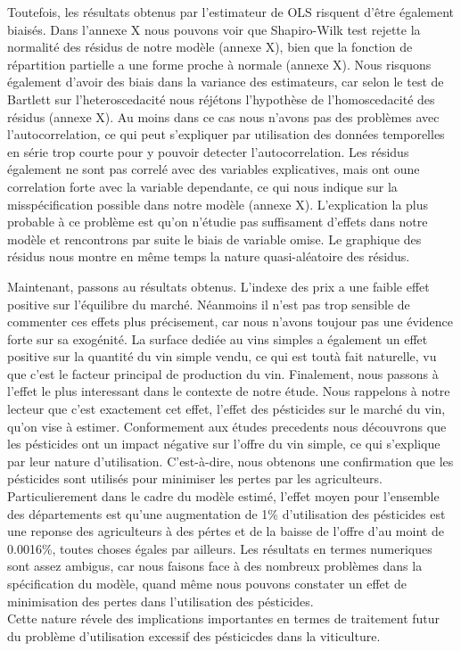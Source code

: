 \documentclass[11pt,]{article}
\begin{document}
Toutefois, les résultats obtenus par l'estimateur de OLS risquent d'être
également biaisés. Dans l'annexe X nous pouvons voir que Shapiro-Wilk
test rejette la normalité des résidus de notre modèle (annexe X), bien
que la fonction de répartition partielle a une forme proche à normale
(annexe X). Nous risquons également d'avoir des biais dans la variance
des estimateurs, car selon le test de Bartlett sur l'heteroscedacité
nous réjétons l'hypothèse de l'homoscedacité des résidus (annexe X). Au
moins dans ce cas nous n'avons pas des problèmes avec l'autocorrelation,
ce qui peut s'expliquer par utilisation des données temporelles en série
trop courte pour y pouvoir detecter l'autocorrelation. Les résidus
également ne sont pas correlé avec des variables explicatives, mais ont
oune correlation forte avec la variable dependante, ce qui nous indique
sur la misspécification possible dans notre modèle (annexe X).
L'explication la plus probable à ce problème est qu'on n'étudie pas
suffisament d'effets dans notre modèle et rencontrons par suite le biais
de variable omise. Le graphique des résidus nous montre en même temps la
nature quasi-aléatoire des résidus.

Maintenant, passons au résultats obtenus. L'indexe des prix a une faible
effet positive sur l'équilibre du marché. Néanmoins il n'est pas trop
sensible de commenter ces effets plus précisement, car nous n'avons
toujour pas une évidence forte sur sa exogénité. La surface dediée au
vins simples a également un effet positive sur la quantité du vin simple
vendu, ce qui est toutà fait naturelle, vu que c'est le facteur
principal de production du vin. Finalement, nous passons à l'effet le
plus interessant dans le contexte de notre étude. Nous rappelons à notre
lecteur que c'est exactement cet effet, l'effet des pésticides sur le
marché du vin, qu'on vise à estimer. Conformement aux études precedents
nous découvrons que les pésticides ont un impact négative sur l'offre du
vin simple, ce qui s'explique par leur nature d'utilisation.
C'est-à-dire, nous obtenons une confirmation que les pésticides sont
utilisés pour minimiser les pertes par les agriculteurs.
Particulierement dans le cadre du modèle estimé, l'effet moyen pour
l'ensemble des départements est qu'une augmentation de 1\% d'utilisation
des pésticides est une reponse des agriculteurs à des pértes et de la
baisse de l'offre d'au moint de 0.0016\%, toutes choses égales par
ailleurs. Les résultats en termes numeriques sont assez ambigus, car
nous faisons face à des nombreux problèmes dans la spécification du
modèle, quand même nous pouvons constater un effet de minimisation des
pertes dans l'utilisation des pésticides.\\
Cette nature révele des implications importantes en termes de traitement
futur du problème d'utilisation excessif des pésticicdes dans la
viticulture.
\end{document}
